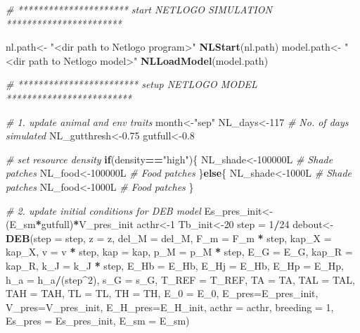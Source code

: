 \documentclass[]{article}
\newenvironment{Shaded}{\begin{snugshade}}{\end{snugshade}}
\newcommand{\KeywordTok}[1]{\textcolor[rgb]{0.13,0.29,0.53}{\textbf{#1}}}
\newcommand{\DataTypeTok}[1]{\textcolor[rgb]{0.13,0.29,0.53}{#1}}
\newcommand{\DecValTok}[1]{\textcolor[rgb]{0.00,0.00,0.81}{#1}}
\newcommand{\FloatTok}[1]{\textcolor[rgb]{0.00,0.00,0.81}{#1}}
\newcommand{\StringTok}[1]{\textcolor[rgb]{0.31,0.60,0.02}{#1}}
\newcommand{\CommentTok}[1]{\textcolor[rgb]{0.56,0.35,0.01}{\textit{#1}}}
\newcommand{\ControlFlowTok}[1]{\textcolor[rgb]{0.13,0.29,0.53}{\textbf{#1}}}
\newcommand{\OperatorTok}[1]{\textcolor[rgb]{0.81,0.36,0.00}{\textbf{#1}}}
\newcommand{\NormalTok}[1]{#1}
\begin{document}
\begin{Shaded}
\begin{Highlighting}[]
\CommentTok{# ********************** start NETLOGO SIMULATION  ***********************}

\NormalTok{nl.path<-}\StringTok{ "<dir path to Netlogo program>"}
\KeywordTok{NLStart}\NormalTok{(nl.path)}
\NormalTok{model.path<-}\StringTok{ "<dir path to Netlogo model>"}
\KeywordTok{NLLoadModel}\NormalTok{(model.path)}

\CommentTok{# ************************ setup NETLOGO MODEL *************************}

\CommentTok{# 1. update animal and env traits}
\NormalTok{month<-}\StringTok{"sep"}
\NormalTok{NL_days<-}\DecValTok{117}       \CommentTok{# No. of days simulated}
\NormalTok{NL_gutthresh<-}\FloatTok{0.75}
\NormalTok{gutfull<-}\FloatTok{0.8}

\CommentTok{# set resource density}
\ControlFlowTok{if}\NormalTok{(density}\OperatorTok{==}\StringTok{"high"}\NormalTok{)\{}
\NormalTok{    NL_shade<-100000L       }\CommentTok{# Shade patches}
\NormalTok{    NL_food<-100000L         }\CommentTok{# Food patches}
\NormalTok{    \}}\ControlFlowTok{else}\NormalTok{\{ }
\NormalTok{    NL_shade<-1000L     }\CommentTok{# Shade patches}
\NormalTok{    NL_food<-1000L  }\CommentTok{# Food patches}
\NormalTok{\}}

\CommentTok{# 2. update initial conditions for DEB model }
\NormalTok{Es_pres_init<-(E_sm}\OperatorTok{*}\NormalTok{gutfull)}\OperatorTok{*}\NormalTok{V_pres_init}
\NormalTok{acthr<-}\DecValTok{1}
\NormalTok{Tb_init<-}\DecValTok{20}
\NormalTok{step =}\StringTok{ }\DecValTok{1}\OperatorTok{/}\DecValTok{24}
\NormalTok{debout<-}\KeywordTok{DEB}\NormalTok{(}\DataTypeTok{step =}\NormalTok{ step, }\DataTypeTok{z =}\NormalTok{ z, }\DataTypeTok{del_M =}\NormalTok{ del_M, }\DataTypeTok{F_m =}\NormalTok{ F_m }\OperatorTok{*}\StringTok{ }
\StringTok{    }\NormalTok{step, }\DataTypeTok{kap_X =}\NormalTok{ kap_X, }\DataTypeTok{v =}\NormalTok{ v }\OperatorTok{*}\StringTok{ }\NormalTok{step, }\DataTypeTok{kap =}\NormalTok{ kap, }\DataTypeTok{p_M =}\NormalTok{ p_M }\OperatorTok{*}\StringTok{ }
\StringTok{    }\NormalTok{step, }\DataTypeTok{E_G =}\NormalTok{ E_G, }\DataTypeTok{kap_R =}\NormalTok{ kap_R, }\DataTypeTok{k_J =}\NormalTok{ k_J }\OperatorTok{*}\StringTok{ }\NormalTok{step, }\DataTypeTok{E_Hb =}\NormalTok{ E_Hb, }
    \DataTypeTok{E_Hj =}\NormalTok{ E_Hb, }\DataTypeTok{E_Hp =}\NormalTok{ E_Hp, }\DataTypeTok{h_a =}\NormalTok{ h_a}\OperatorTok{/}\NormalTok{(step}\OperatorTok{^}\DecValTok{2}\NormalTok{), }\DataTypeTok{s_G =}\NormalTok{ s_G, }
    \DataTypeTok{T_REF =}\NormalTok{ T_REF, }\DataTypeTok{TA =}\NormalTok{ TA, }\DataTypeTok{TAL =}\NormalTok{ TAL, }\DataTypeTok{TAH =}\NormalTok{ TAH, }\DataTypeTok{TL =}\NormalTok{ TL, }
    \DataTypeTok{TH =}\NormalTok{ TH, }\DataTypeTok{E_0 =}\NormalTok{ E_}\DecValTok{0}\NormalTok{, }\DataTypeTok{E_pres=}\NormalTok{E_pres_init, }\DataTypeTok{V_pres=}\NormalTok{V_pres_init, }\DataTypeTok{E_H_pres=}\NormalTok{E_H_init, }\DataTypeTok{acthr =}\NormalTok{ acthr, }\DataTypeTok{breeding =} \DecValTok{1}\NormalTok{, }\DataTypeTok{Es_pres =}\NormalTok{ Es_pres_init, }\DataTypeTok{E_sm =}\NormalTok{ E_sm)}


\end{Highlighting}
\end{Shaded}
\end{document}
